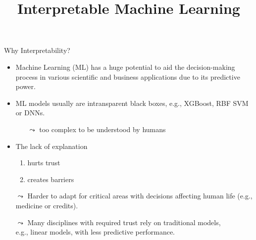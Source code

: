 \documentclass[11pt,compress,t,notes=noshow, xcolor=table]{beamer}
\title{Interpretable Machine Learning}
\institute{\href{https://compstat-lmu.github.io/lecture_iml/}{compstat-lmu.github.io/lecture\_iml}}
\date{}
\begin{document}


\newcommand{\titlefigure}{figure/open_blackbox}
\newcommand{\learninggoals}{
\item Why do we need interpretability?
\item What have been the developments until now?}





	\begin{vbframe}{Why Interpretability?}
		
		\begin{itemize}
			\item Machine Learning (ML) has a huge potential to aid the decision-making process in various scientific and business applications due to its predictive power.
			\smallskip
			\item ML models usually are intransparent black boxes, e.g., XGBoost, RBF SVM or DNNs.
			\begin{itemize}
				\item[$\leadsto$] too complex to be understood by humans
			\end{itemize}
			\smallskip
			\item The lack of explanation
			\begin{enumerate}
				\item hurts trust
				\item creates barriers
			\end{enumerate}  
			
			\smallskip
		    \item[$\leadsto$] Harder to adapt for critical areas with decisions affecting human life (e.g., medicine or credits).
			
			\item[$\leadsto$] Many disciplines with required trust rely on traditional models,\\ e.g., linear models, with less predictive performance.
		\end{itemize}
		
	\end{vbframe}
	
	
\end{document}

